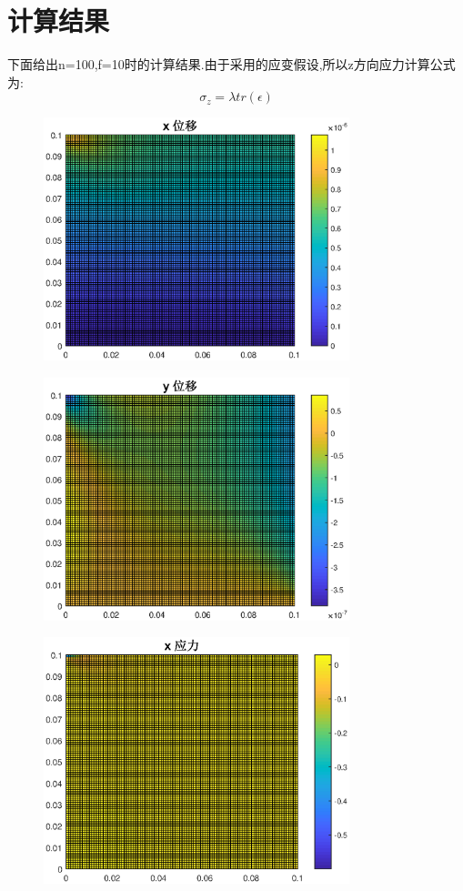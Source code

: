\documentclass[UTF8]{ctexart}
\begin{document}
\section{计算结果}
下面给出n=100,f=10时的计算结果.由于采用的应变假设,所以z方向应力计算公式为:
$$
\sigma_z = \lambda tr(\epsilon)
$$
\begin{figure}[htbp]
\centering\includegraphics[width=3.5in]{dispx.eps}

\end{figure}
\begin{figure}[htbp]
\centering\includegraphics[width=3.5in]{dispy.eps}

\end{figure}
\begin{figure}[htbp]
\centering\includegraphics[width=3.5in]{stressx.eps}

\end{figure}
\end{document}
